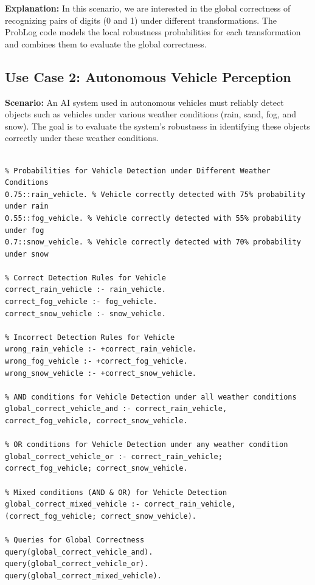 \textbf{Explanation:} In this scenario, we are interested in the global correctness of recognizing pairs of digits (0 and 1) under different transformations. The ProbLog code models the local robustness probabilities for each transformation and combines them to evaluate the global correctness.

\subsection{Use Case 2: Autonomous Vehicle Perception}

\textbf{Scenario:} An AI system used in autonomous vehicles must reliably detect objects such as vehicles under various weather conditions (rain, sand, fog, and snow). The goal is to evaluate the system's robustness in identifying these objects correctly under these weather conditions.

\begin{mdframed}[leftline=false, rightline=false, topline=true, bottomline=true]
  \scriptsize
  \begin{verbatim}

% Probabilities for Vehicle Detection under Different Weather Conditions
0.75::rain_vehicle. % Vehicle correctly detected with 75% probability under rain
0.55::fog_vehicle. % Vehicle correctly detected with 55% probability under fog
0.7::snow_vehicle. % Vehicle correctly detected with 70% probability under snow

% Correct Detection Rules for Vehicle
correct_rain_vehicle :- rain_vehicle.
correct_fog_vehicle :- fog_vehicle.
correct_snow_vehicle :- snow_vehicle.

% Incorrect Detection Rules for Vehicle
wrong_rain_vehicle :- +correct_rain_vehicle.
wrong_fog_vehicle :- +correct_fog_vehicle.
wrong_snow_vehicle :- +correct_snow_vehicle.

% AND conditions for Vehicle Detection under all weather conditions
global_correct_vehicle_and :- correct_rain_vehicle, correct_fog_vehicle, correct_snow_vehicle.

% OR conditions for Vehicle Detection under any weather condition
global_correct_vehicle_or :- correct_rain_vehicle; correct_fog_vehicle; correct_snow_vehicle.

% Mixed conditions (AND & OR) for Vehicle Detection
global_correct_mixed_vehicle :- correct_rain_vehicle, (correct_fog_vehicle; correct_snow_vehicle).

% Queries for Global Correctness
query(global_correct_vehicle_and).
query(global_correct_vehicle_or).
query(global_correct_mixed_vehicle).
\end{verbatim}
\end{mdframed}

